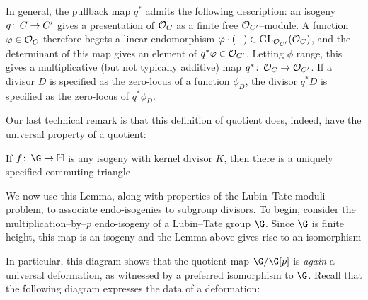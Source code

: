 \begin{remark}
In general, the pullback map $q^*$ admits the following description: an isogeny $q\colon\thinspace C \to C'$ gives a presentation of $\mathcal{O}_C$ as a finite free $\mathcal{O}_{C'}$--module.  A function $\varphi \in \mathcal{O}_C$ therefore begets a linear endomorphism $\varphi \cdot (-) \in \operatorname{GL}_{\mathcal{O}_{C'}}(\mathcal{O}_C)$, and the determinant of this map gives an element of $q^* \varphi \in \mathcal{O}_{C'}$.  Letting $\phi$ range, this gives a multiplicative (but not typically additive) map $q^*\colon\thinspace \mathcal{O}_C \to \mathcal{O}_{C'}$.  If a divisor $D$ is specified as the zero-locus of a function $\phi_D$, the divisor $q^* D$ is specified as the zero-locus of $q^* \phi_D$.
\end{remark}

Our last technical remark is that this definition of quotient does, indeed, have the universal property of a quotient:

\begin{lemma}
If $f\co \G \to \mathbb H$ is any isogeny with kernel divisor $K$, then there is a uniquely specified commuting triangle
\begin{center}
\end{center}
\end{lemma}

We now use this Lemma, along with properties of the Lubin--Tate moduli problem, to associate endo-isogenies to subgroup divisors.  To begin, consider the multiplication--by--$p$ endo-isogeny of a Lubin--Tate group $\G$.  Since $\G$ is finite height, this map is an isogeny and the Lemma above gives rise to an isomorphism
\begin{center}
\end{center}
In particular, this diagram shows that the quotient map $\G / \G[p]$ is \emph{again} a universal deformation, as witnessed by a preferred isomorphism to $\G$.  Recall that the following diagram expresses the data of a deformation:
\begin{center}
\end{center}


